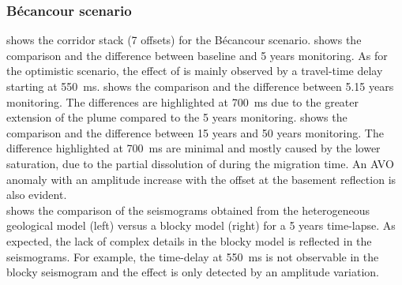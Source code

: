 \subsubsection{Bécancour scenario}
 shows the corridor stack (7 offsets) for the Bécancour
scenario.  shows the comparison and the difference between
baseline and \num{5} years monitoring. As for the optimistic scenario, the
effect of  is mainly observed by a travel-time delay starting at
\SI{550}{\ms}.  shows the comparison and the difference
between \numlist{5,15} years monitoring. The differences are highlighted at
\SI{700}{\ms} due to the greater extension of the  plume compared to the
\num{5} years monitoring.  shows the comparison and the
difference between \num{15} years and \num{50} years monitoring. The difference
highlighted at \SI{700}{\ms} are minimal and mostly caused by the lower 
saturation, due to the partial dissolution of  during the migration
time.
An AVO anomaly with an amplitude increase with the offset at the basement
reflection is also evident.\\
 shows the comparison of the seismograms obtained from
the heterogeneous geological model (left) versus a blocky model (right) for a
\num{5} years time-lapse. As expected, the lack of complex details in the blocky
model is reflected in the seismograms. For example, the time-delay at
\SI{550}{\ms} is not observable in the blocky seismogram and the  effect
is only detected by an amplitude variation.\\

